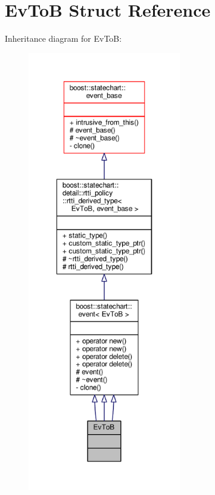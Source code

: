 \hypertarget{struct_ev_to_b}{}\section{Ev\+ToB Struct Reference}
\label{struct_ev_to_b}


Inheritance diagram for Ev\+ToB\+:
\nopagebreak
\begin{figure}[H]
\begin{center}
\leavevmode
\includegraphics[height=550pt]{struct_ev_to_b__inherit__graph}
\end{center}
\end{figure}


